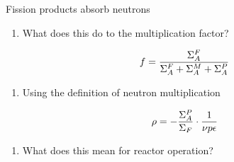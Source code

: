 \documentclass[aspectratio=1610,pdftex,dvipsnames,compress,xcolor={dvipsnames}]{beamer}
\begin{document}
\begin{frame}{Fission products absorb neutrons}
    \begin{enumerate}[series=outerlist,topsep=0pt,itemsep=21pt,leftmargin=*,label=(\arabic*)]
        \item[]What does this do to the multiplication factor? 
    \end{enumerate}

    \vspace*{\fill}

    \begin{equation}
        \LARGE
        f = \frac{\Sigma_A^F}{\Sigma_A^F+\Sigma_A^M+\Sigma_A^P}
    \end{equation}

    \vspace*{\fill}

    \begin{enumerate}[series=outerlist,topsep=0pt,itemsep=21pt,leftmargin=*,label=(\arabic*)]
        \item[]Using the definition of neutron multiplication
    \end{enumerate}

    \vspace*{\fill}

    \begin{equation}
        \LARGE
        \rho = -\frac{\Sigma_A^P}{\Sigma_F} \cdot \frac{1}{\nu p \epsilon}
    \end{equation}

    \vspace*{\fill}

    \begin{enumerate}[series=outerlist,topsep=0pt,itemsep=21pt,leftmargin=*,label=(\arabic*)]
        \item[]What does this mean for reactor operation?
    \end{enumerate}
\end{frame}
\end{document}
